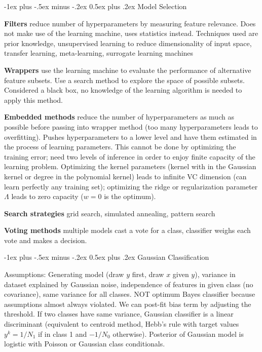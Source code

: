 \documentclass[10pt,landscape]{article}
\makeatletter
\renewcommand{\section}{\@startsection{section}{1}{0mm}%
                                {-1ex plus -.5ex minus -.2ex}%
                                {0.5ex plus .2ex}%
                                {\normalfont\large\bfseries}}
\makeatother
\begin{document}
\begin{multicols}{3}

\section{Model Selection}

\textbf{Filters} reduce number of hyperparameters by measuring feature relevance. Does not make use of the learning machine, uses statistics instead. Techniques used are prior knowledge, unsupervised learning to reduce dimensionality of input space, transfer learning, meta-learning, surrogate learning machines

\textbf{Wrappers} use the learning machine to evaluate the performance of alternative feature subsets. Use a search method to explore the space of possible subsets. Considered a black box, no knowledge of the learning algorithm is needed to apply this method.

\textbf{Embedded methods} reduce the number of hyperparameters as much as possible before passing into wrapper method (too many hyperparameters leads to overfitting). Pushes hyperparameters to a lower level and have them estimated in the process of learning parameters. This cannot be done by optimizing the training error; need two levels of inference in order to enjoy finite capacity of the learning problem. Optimizing the kernel parameters (kernel with in the Gaussian kernel or degree in the polynomial kernel) leads to infinite VC dimension (can learn perfectly any training set); optimizing the ridge or regularization parameter $\Lambda$ leads to zero capacity ($w=0$ is the optimum).

\textbf{Search strategies} grid search, simulated annealing, pattern search

\textbf{Voting methods} multiple models cast a vote for a class, classifier weighs each vote and makes a decision.


\section{Gaussian Classification}

Assumptions: Generating model (draw $y$ first, draw $x$ given $y$), variance in dataset explained by Gaussian noise, independence of features in given class (no covariance), same variance for all classes. NOT optimum Bayes classifier because assumptions almost always violated. We can post-fit bias term by adjusting the threshold. If two classes have same variance, Gaussian classifier is a linear discriminant (equivalent to centroid method, Hebb's rule with target values $y^k = 1/N_1$ if in class 1 and $-1/N_0$ otherwise). Posterior of Gaussian model is logistic with Poisson or Gaussian class conditionals.


\end{multicols}
\end{document}
